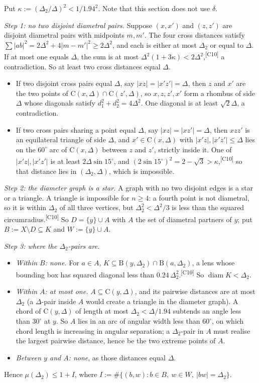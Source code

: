 \documentclass[11pt]{amsart}
\theoremstyle{definition}
\theoremstyle{remark}
\newcommand{\Dt}{\Delta_2}
\newcommand{\mult}{\mu}
\newcommand{\Cc}{\mathrm{C}}      %
\newcommand{\Dd}{\mathrm{B}}      %
\newcommand{\chk}[1]{\textsuperscript{[#1]}}
\begin{document}
Put $\kappa:=(\Dt/\Delta)^2<1/1.94^2$. Note that this section does not use $\delta$.

\emph{Step 1: no two disjoint diametral pairs.} Suppose $(x,x')$ and $(z,z')$ are disjoint diametral pairs with midpoints $m,m'$. The four cross distances satisfy $\sum|ab|^2=2\Delta^2+4|m-m'|^2\ge2\Delta^2$, and each is either at most $\Dt$ or equal to $\Delta$. If at most one equals $\Delta$, the sum is at most $\Delta^2(1+3\kappa)<2\Delta^2$,\chk{C10} a contradiction. So at least two cross distances equal $\Delta$.
\begin{itemize}[leftmargin=2em]
\item If two disjoint cross pairs equal $\Delta$, say $|xz|=|x'z'|=\Delta$, then $z$ and $x'$ are the two points of $\Cc(x,\Delta)\cap\Cc(z',\Delta)$, so $x,z,z',x'$ form a rhombus of side $\Delta$ whose diagonals satisfy $d_1^2+d_2^2=4\Delta^2$. One diagonal is at least $\sqrt2\Delta$, a contradiction.
\item If two cross pairs sharing a point equal $\Delta$, say $|xz|=|xz'|=\Delta$, then $xzz'$ is an equilateral triangle of side $\Delta$, and $x'\in\Cc(x,\Delta)$ with $|x'z|,|x'z'|\le\Delta$ lies on the $60^\circ$ arc of $\Cc(x,\Delta)$ between $z$ and $z'$, strictly inside it. One of $|x'z|,|x'z'|$ is at least $2\Delta\sin15^\circ$, and $(2\sin15^\circ)^2=2-\sqrt3>\kappa$,\chk{C10} so that distance lies in $(\Dt,\Delta)$, which is impossible.
\end{itemize}

\emph{Step 2: the diameter graph is a star.} A graph with no two disjoint edges is a star or a triangle. A triangle is impossible for $n\ge4$: a fourth point is not diametral, so it is within $\Dt$ of all three vertices, but $\Dt^2<\Delta^2/3$ is less than the squared circumradius.\chk{C10} So $D=\{y\}\cup A$ with $A$ the set of diametral partners of $y$; put $B:=X\setminus D\subseteq K$ and $W:=\{y\}\cup A$.

\emph{Step 3: where the $\Dt$-pairs are.}
\begin{itemize}[leftmargin=2em]
\item \emph{Within $B$: none.} For $a\in A$, $K\subseteq\Dd(y,\Dt)\cap\Dd(a,\Dt)$, a lens whose bounding box has squared diagonal less than $0.24\,\Dt^2$.\chk{C10} So $\operatorname{diam}K<\Dt$.
\item \emph{Within $A$: at most one.} $A\subseteq\Cc(y,\Delta)$, and its pairwise distances are at most $\Dt$ (a $\Delta$-pair inside $A$ would create a triangle in the diameter graph). A chord of $\Cc(y,\Delta)$ of length at most $\Dt<\Delta/1.94$ subtends an angle less than $30^\circ$ at $y$. So $A$ lies in an arc of angular width less than $60^\circ$, on which chord length is increasing in angular separation; a $\Dt$-pair in $A$ must realise the largest pairwise distance, hence be the two extreme points of $A$.
\item \emph{Between $y$ and $A$: none}, as those distances equal $\Delta$.
\end{itemize}
Hence $\mult(\Dt)\le1+I$, where $I:=\#\{(b,w):b\in B,\ w\in W,\ |bw|=\Dt\}$.
\end{document}
